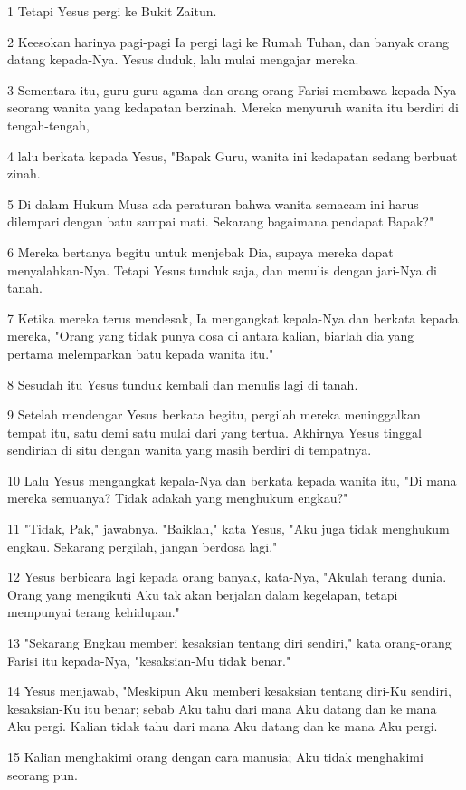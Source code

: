 \par 1 Tetapi Yesus pergi ke Bukit Zaitun.
\par 2 Keesokan harinya pagi-pagi Ia pergi lagi ke Rumah Tuhan, dan banyak orang datang kepada-Nya. Yesus duduk, lalu mulai mengajar mereka.
\par 3 Sementara itu, guru-guru agama dan orang-orang Farisi membawa kepada-Nya seorang wanita yang kedapatan berzinah. Mereka menyuruh wanita itu berdiri di tengah-tengah,
\par 4 lalu berkata kepada Yesus, "Bapak Guru, wanita ini kedapatan sedang berbuat zinah.
\par 5 Di dalam Hukum Musa ada peraturan bahwa wanita semacam ini harus dilempari dengan batu sampai mati. Sekarang bagaimana pendapat Bapak?"
\par 6 Mereka bertanya begitu untuk menjebak Dia, supaya mereka dapat menyalahkan-Nya. Tetapi Yesus tunduk saja, dan menulis dengan jari-Nya di tanah.
\par 7 Ketika mereka terus mendesak, Ia mengangkat kepala-Nya dan berkata kepada mereka, "Orang yang tidak punya dosa di antara kalian, biarlah dia yang pertama melemparkan batu kepada wanita itu."
\par 8 Sesudah itu Yesus tunduk kembali dan menulis lagi di tanah.
\par 9 Setelah mendengar Yesus berkata begitu, pergilah mereka meninggalkan tempat itu, satu demi satu mulai dari yang tertua. Akhirnya Yesus tinggal sendirian di situ dengan wanita yang masih berdiri di tempatnya.
\par 10 Lalu Yesus mengangkat kepala-Nya dan berkata kepada wanita itu, "Di mana mereka semuanya? Tidak adakah yang menghukum engkau?"
\par 11 "Tidak, Pak," jawabnya. "Baiklah," kata Yesus, "Aku juga tidak menghukum engkau. Sekarang pergilah, jangan berdosa lagi."
\par 12 Yesus berbicara lagi kepada orang banyak, kata-Nya, "Akulah terang dunia. Orang yang mengikuti Aku tak akan berjalan dalam kegelapan, tetapi mempunyai terang kehidupan."
\par 13 "Sekarang Engkau memberi kesaksian tentang diri sendiri," kata orang-orang Farisi itu kepada-Nya, "kesaksian-Mu tidak benar."
\par 14 Yesus menjawab, "Meskipun Aku memberi kesaksian tentang diri-Ku sendiri, kesaksian-Ku itu benar; sebab Aku tahu dari mana Aku datang dan ke mana Aku pergi. Kalian tidak tahu dari mana Aku datang dan ke mana Aku pergi.
\par 15 Kalian menghakimi orang dengan cara manusia; Aku tidak menghakimi seorang pun.
